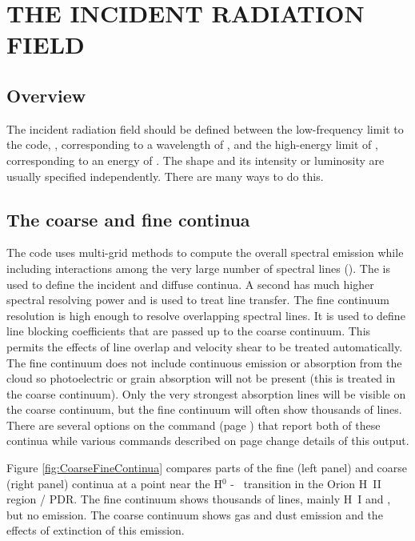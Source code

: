 \chapter{THE INCIDENT RADIATION FIELD}

\section{Overview}

The incident radiation field should be defined between the low-frequency limit
to the code, \emmmhz, corresponding to a wavelength of \emmcm,
and the high-energy limit of \egamry, corresponding to an energy of \egamrymev.
The shape and its intensity or luminosity are usually specified
independently.
There are many ways to do this.

\section{The coarse and fine continua}

The code uses multi-grid methods to compute the overall spectral emission while
including  interactions among the
very large number of spectral lines (\citealp{Shaw2005}).  
The  is used to define the
incident and diffuse continua.
A second  has much higher spectral resolving power and
is used to treat line transfer.
The fine continuum resolution is high enough to resolve overlapping spectral
lines.  
It is used to define line blocking coefficients that are passed up to the coarse continuum.  
This permits the effects of line overlap and velocity shear to be treated automatically.
The fine continuum does not include continuous
emission or absorption from the cloud so photoelectric or grain absorption will not be present
(this is treated in the coarse continuum).  
Only the very strongest absorption lines will be visible on the coarse continuum, but
the fine continuum will often show thousands of lines.
There are several options
on the  command 
(page \pageref{sec:CommandSaveContinuum}) that report both of these continua
while various  commands described on 
page \pageref{sec:CommandSetContinuumOptions} change details of this output.

Figure \ref{fig:CoarseFineContinua} compares parts of the fine (left panel) and
coarse (right panel) continua at a point near the H$^0$ - \htwo\ transition in 
the Orion H~II region / PDR.  
The fine continuum shows thousands of lines, mainly H~I and \htwo, but no emission.
The coarse continuum shows gas and dust emission and the effects of extinction of this emission.


